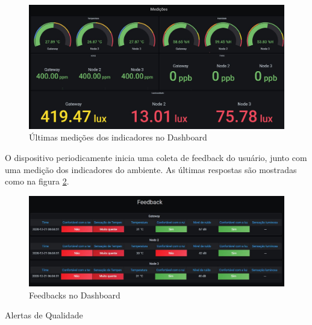 \documentclass[../monografia.tex]{subfiles}
\begin{document}
\begin{figure}[h]
	\centering
	\includegraphics[width=\textwidth]{dashboard-medicoes}
	\caption{Últimas medições dos indicadores no Dashboard}
	\label{fig:dashboard-medicoes}
\end{figure}

\newpage
O dispositivo periodicamente inicia uma coleta de feedback do usuário, junto com uma medição dos indicadores do ambiente. As últimas respostas são mostradas como na figura \ref{fig:dashboard-feedback}. 

\begin{figure}[h]
	\centering
	\includegraphics[width=\textwidth]{dashboard-feedback}
	\caption{Feedbacks no Dashboard}
	\label{fig:dashboard-feedback}
\end{figure}

Alertas de Qualidade
\end{document}
